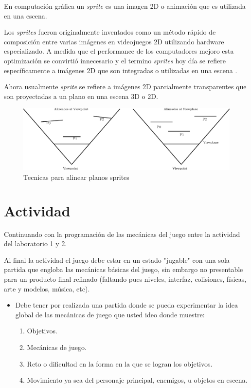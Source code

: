 En computación gráfica un \emph{sprite} es una imagen 2D o animación que es utilizada en una escena.

Los \emph{sprites} fueron originalmente inventados como un método rápido de composición entre varias imágenes en videojuegos 2D utilizando hardware especializado. A medida que el performance de los computadores mejoro esta optimización se convirtió innecesario y el termino \emph{sprites} hoy día se refiere específicamente a imágenes 2D que son integradas o utilizadas en una escena \cite{sprites_siggraph}.

Ahora usualmente \emph{sprite} se refiere a imágenes 2D parcialmente transparentes que son proyectadas a un plano en una escena 3D o 2D.~\\[1cm]
\begin{figure}[H]
\centering
\includegraphics[width=0.95\linewidth]{media/bills.eps} 
\caption{Tecnicas para alinear planos sprites}
\end{figure}

\section{Actividad}
Continuando con la programación de las mecánicas del juego entre la actividad del laboratorio 1 y 2.

Al final la actividad el juego debe estar en un estado "jugable" con una sola partida que engloba las mecánicas básicas del juego, sin embargo no presentable para un producto final refinado (faltando pues niveles, interfaz, colisiones, físicas, arte y modelos, música, etc).

\begin{itemize}
\item Debe tener por realizada una partida donde se pueda experimentar la idea global de las mecánicas de juego que usted ideo donde muestre:
\begin{enumerate}
  \item Objetivos.
  \item Mecánicas de juego.
  \item Reto o dificultad en la forma en la que se logran los objetivos.
  \item Movimiento ya sea del personaje principal, enemigos, u objetos en escena.
\end{enumerate}
\end{itemize}
